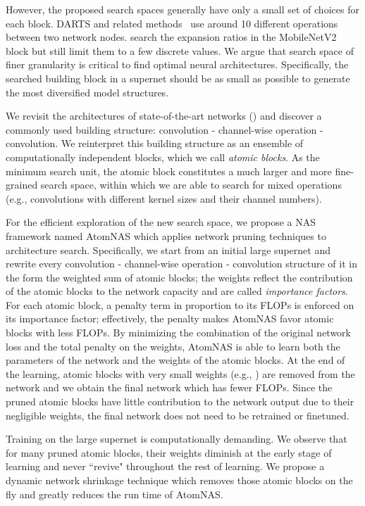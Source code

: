 \documentclass{article} \usepackage{iclr2020_conference,times}
\begin{document}
However, the proposed search spaces generally have only a small set of choices for each block. DARTS and related methods~\citep{hanxiao2019darts,chen2019pdarts, liang2019dartsplus} use around 10 different operations between two network nodes. \cite{howard2019mobilenetv3,han2019proxyless,wu2019fbnet,stamoulis2019single_path} search the expansion ratios in the MobileNetV2 block but still limit them to a few discrete values. We argue that search space of finer granularity is critical to find optimal neural architectures. Specifically, the searched building block in a supernet should be as small as possible to generate the most diversified model structures.


We revisit the architectures of state-of-the-art networks (\cite{howard2019mobilenetv3,tan2019mixnet,he2016resnet}) and discover a commonly used building structure: convolution - channel-wise operation - convolution. We reinterpret this building structure as an ensemble of computationally independent blocks, which we call \textit{atomic blocks}. 
As the minimum search unit, the atomic block constitutes a much larger and more fine-grained search space, within which we are able to search for mixed operations (e.g., convolutions with different kernel sizes and their channel numbers).


For the efficient exploration of the new search space, we propose a NAS framework named AtomNAS which applies network pruning techniques to architecture search.
Specifically, we start from an initial large supernet and rewrite every convolution - channel-wise operation - convolution structure of it in the form the weighted sum of atomic blocks; the weights reflect the contribution of the atomic blocks to the network capacity and are called \textit{importance factors}. For each atomic block, a penalty term in proportion to its FLOPs is enforced on its importance factor; effectively, the penalty makes AtomNAS favor atomic blocks with less FLOPs. By minimizing the combination of the original network loss and the total penalty on the weights, AtomNAS is able to learn both the parameters of the network and the weights of the atomic blocks. At the end of the learning, atomic blocks with very small weights (e.g., ) are removed from the network and we obtain the final network which has fewer FLOPs. Since the pruned atomic blocks have little contribution to the network output due to their negligible weights, the final network does not need to be retrained or finetuned.

Training on the large supernet is computationally demanding. We observe that for many pruned atomic blocks, their weights diminish at the early stage of learning and never ``revive" throughout the rest of learning. We propose a dynamic network shrinkage technique which removes those atomic blocks on the fly and greatly reduces the run time of AtomNAS.
\end{document}
